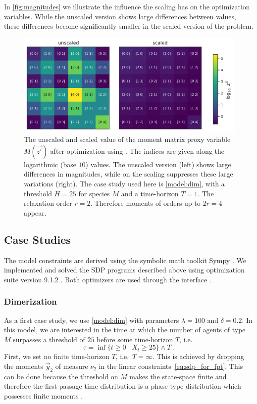 In \autoref{fig:magnitudes} we illustrate the influence the scaling has on the
optimization variables. While the unscaled version shows large differences
between values, these differences become significantly smaller in the scaled version
of the problem.
\begin{figure}[htb]
    \centering
    \includegraphics[width=\textwidth]{gfx/magnitudes.pdf}
	\caption[Moment matrix scaling]{The unscaled and scaled value of the moment matrix proxy variable
    $M(\vec{z'})$ after optimization using . The indices are given along the
    logarithmic (base $10$) values. The unscaled version (left) shows large
    differences in magnitudes, while on the scaling suppresses
    these large variations (right). The case study used here is \autoref{model:dim},
    with a threshold $H=25$ for species $M$ and a time-horizon $T=1$. The
    relaxation order $r=2$. Therefore moments of orders up to $2r=4$ appear.}
    \label{fig:magnitudes}
\end{figure}


\subsection{Case Studies}
The model constraints are derived using the symbolic math toolkit Sympy \parencite{sympy}.
We implemented and solved the \ac{SDP} programs described above using optimization suite  version 9.1.2 \parencite{mosek}.
Both optimizers are used through the  interface \parencite{cvxpy}.

\subsubsection*{Dimerization}
As a first case study, we use \autoref{model:dim} with parameters $\lambda=100$ and $\delta=0.2$.
In this model, we are interested in the time at which the number of agents of type $M$
surpasses a threshold of $25$ before some time-horizon $T$,
i.e.\ \[
	\tau=\inf\{t\geq 0\mid X_t \geq 25\}\land T\,.
\]
First, we set no finite time-horizon $T$, i.e.\ $T=\infty$.
This is achieved by dropping the moments $\vec y_2$
of measure $\nu_2$ in the linear constraints~\eqref{eq:sdp_for_fpt}.
This can be done because the threshold on $M$ makes the state-space finite
and therefore the first passage time distribution is a phase-type distribution
which possesses finite moments \parencite[][Chapter 7.6]{stewart2009probability}.

